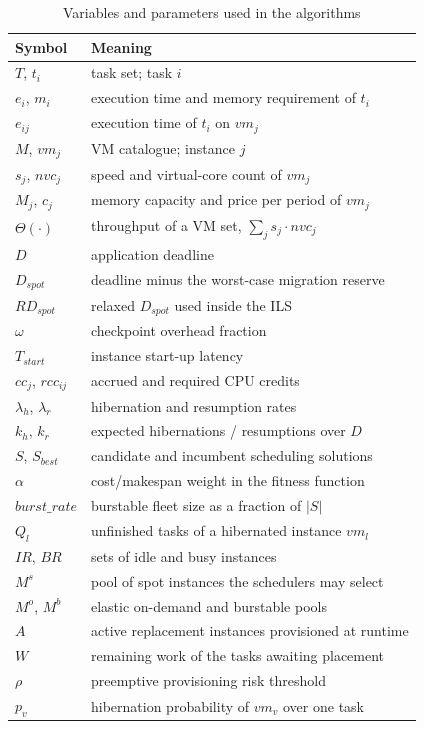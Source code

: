 \documentclass[conference]{IEEEtran}
\begin{document}
\begin{table}[t]
\caption{Variables and parameters used in the algorithms}
\label{tab:vars}
\centering
\footnotesize
\begin{tabular}{ll}
\toprule
Symbol & Meaning \\
\midrule
$T$, $t_i$ & task set; task $i$ \\
$e_i$, $m_i$ & execution time and memory requirement of $t_i$ \\
$e_{ij}$ & execution time of $t_i$ on $vm_j$ \\
$M$, $vm_j$ & VM catalogue; instance $j$ \\
$s_j$, $\mathit{nvc}_j$ & speed and virtual-core count of $vm_j$ \\
$M_j$, $c_j$ & memory capacity and price per period of $vm_j$ \\
$\Theta(\cdot)$ & throughput of a VM set, $\sum_j s_j\!\cdot\!\mathit{nvc}_j$ \\
$D$ & application deadline \\
$D_{\mathit{spot}}$ & deadline minus the worst-case migration reserve \\
$\mathit{RD}_{\mathit{spot}}$ & relaxed $D_{\mathit{spot}}$ used inside the ILS \\
$\omega$ & checkpoint overhead fraction \\
$T_{\mathit{start}}$ & instance start-up latency \\
$\mathit{cc}_j$, $\mathit{rcc}_{ij}$ & accrued and required CPU credits \\
$\lambda_h$, $\lambda_r$ & hibernation and resumption rates \\
$k_h$, $k_r$ & expected hibernations / resumptions over $D$ \\
$S$, $S_{\mathit{best}}$ & candidate and incumbent scheduling solutions \\
$\alpha$ & cost/makespan weight in the fitness function \\
$\mathit{burst\_rate}$ & burstable fleet size as a fraction of $|S|$ \\
$Q_l$ & unfinished tasks of a hibernated instance $vm_l$ \\
$\mathit{IR}$, $\mathit{BR}$ & sets of idle and busy instances \\
$M^{s}$ & pool of spot instances the schedulers may select \\
$M^{o}$, $M^{b}$ & elastic on-demand and burstable pools \\
$A$ & active replacement instances provisioned at runtime \\
$W$ & remaining work of the tasks awaiting placement \\
$\rho$ & preemptive provisioning risk threshold \\
$p_v$ & hibernation probability of $vm_v$ over one task \\
\bottomrule
\end{tabular}
\end{table}
\end{document}
